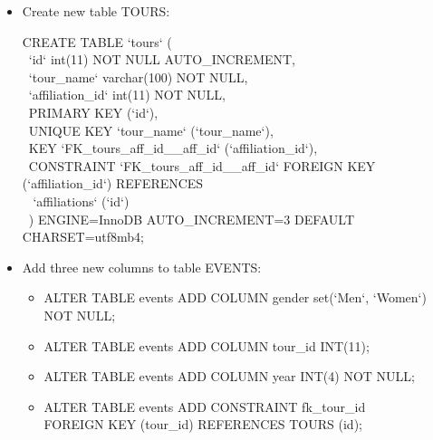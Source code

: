\documentclass[titlepage]{article}
\begin{document}
\begin{itemize}
\vspace{1em}

\item Create new table TOURS: \vspace{1em}

\hspace{15pt}CREATE TABLE `tours` ( \\
\-\ \hspace{30pt}`id` int(11) NOT NULL AUTO\_INCREMENT, \\
\-\ \hspace{30pt}`tour\_name` varchar(100) NOT NULL, \\
\-\ \hspace{30pt}`affiliation\_id` int(11) NOT NULL, \\
\-\ \hspace{30pt}PRIMARY KEY (`id`), \\
\-\ \hspace{30pt}UNIQUE KEY `tour\_name` (`tour\_name`), \\
\-\ \hspace{30pt}KEY `FK\_tours\_aff\_id\_\_aff\_id` (`affiliation\_id`), \\
\-\ \hspace{30pt}CONSTRAINT `FK\_tours\_aff\_id\_\_aff\_id` FOREIGN KEY (`affiliation\_id`) REFERENCES \\ \-\ \hspace{30pt} `affiliations` (`id`) \\
\-\ \hspace{15pt}) ENGINE=InnoDB AUTO\_INCREMENT=3 DEFAULT CHARSET=utf8mb4;

\vspace{1em}

\item Add three new columns to table EVENTS: \vspace{1em}

\begin{itemize}
  \item ALTER TABLE events ADD COLUMN gender set(‘Men‘, ‘Women‘) NOT NULL;
  \item ALTER TABLE events ADD COLUMN tour\_id INT(11);
  \item ALTER TABLE events ADD COLUMN year INT(4) NOT NULL;
  \item ALTER TABLE events ADD CONSTRAINT fk\_tour\_id \\ FOREIGN KEY (tour\_id) REFERENCES TOURS (id);
\end{itemize}

\vspace{1em}


\end{itemize}
\end{document}
